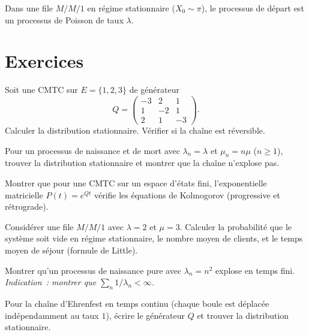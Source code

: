 \begin{theoreme}
\label{thm:burke}
Dans une file $M/M/1$ en r\'egime stationnaire ($X_0 \sim \pi$), le processus
de d\'epart est un processus de Poisson de taux $\lambda$.
\end{theoreme}

\section{Exercices}

\begin{exercice}
Soit une CMTC sur $E = \{1, 2, 3\}$ de g\'en\'erateur
\[
  Q = \begin{pmatrix} -3 & 2 & 1 \\ 1 & -2 & 1 \\ 2 & 1 & -3 \end{pmatrix}.
\]
Calculer la distribution stationnaire. V\'erifier si la cha\^ine est r\'eversible.
\end{exercice}

\begin{exercice}
Pour un processus de naissance et de mort avec $\lambda_n = \lambda$ et
$\mu_n = n\mu$ ($n \geq 1$), trouver la distribution stationnaire et montrer
que la cha\^ine n'explose pas.
\end{exercice}

\begin{exercice}
Montrer que pour une CMTC sur un espace d'\'etats fini, l'exponentielle
matricielle $P(t) = e^{Qt}$ v\'erifie les \'equations de Kolmogorov
(progressive et r\'etrograde).
\end{exercice}

\begin{exercice}
Consid\'erer une file $M/M/1$ avec $\lambda = 2$ et $\mu = 3$. Calculer la
probabilit\'e que le syst\`eme soit vide en r\'egime stationnaire, le nombre moyen
de clients, et le temps moyen de s\'ejour (formule de Little).
\end{exercice}

\begin{exercice}
Montrer qu'un processus de naissance pure avec $\lambda_n = n^2$ explose en
temps fini. \emph{Indication~: montrer que $\sum_{n} 1/\lambda_n < \infty$.}
\end{exercice}

\begin{exercice}
Pour la cha\^ine d'Ehrenfest en temps continu (chaque boule est d\'eplac\'ee
ind\'ependamment au taux $1$), \'ecrire le g\'en\'erateur $Q$ et trouver la
distribution stationnaire.
\end{exercice}
